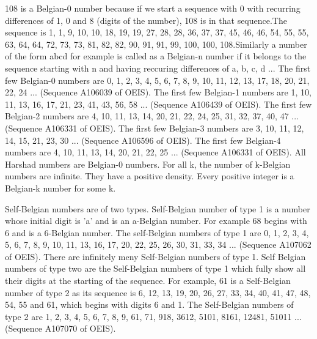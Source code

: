 \documentclass[12pt]{article}
\begin{document}
108 is a Belgian-0 number because if we start a sequence with 0 with recurring differences of 1, 0 and 8 (digits of the number), 108 is in that sequence.The sequence is 1, 1, 9, 10, 10, 18, 19, 19, 27, 28, 28, 36, 37, 37, 45, 46, 46, 54, 55, 55, 63, 64, 64, 72, 73, 73, 81, 82, 82, 90, 91, 91, 99, 100, 100, 108.Similarly a number of the form abcd for example is called as a Belgian-n number if it belongs to the sequence starting with n and having reccuring differences of a, b, c, d ...
The first few Belgian-0 numbers are 0, 1, 2, 3, 4, 5, 6, 7, 8, 9, 10, 11, 12, 13, 17, 18, 20, 21, 22, 24 ... (Sequence A106039 of OEIS). The first few Belgian-1 numbers are 1, 10, 11, 13, 16, 17, 21, 23, 41, 43, 56, 58 ... (Sequence A106439 of OEIS). The first few Belgian-2 numbers are 4, 10, 11, 13, 14, 20, 21, 22, 24, 25, 31, 32, 37, 40, 47 ... (Sequence A106331 of OEIS). The first few Belgian-3 numbers are 3, 10, 11, 12, 14, 15, 21, 23, 30 ... (Sequence A106596 of OEIS). The first few Belgian-4 numbers are 4, 10, 11, 13, 14, 20, 21, 22, 25 ... (Sequence A106331 of OEIS).
All Harshad numbers are Belgian-0 numbers. For all k, the number of k-Belgian numbers are infinite. They have a positive density. Every positive integer is a Belgian-k number for some k.

Self-Belgian numbers are of two types. Self-Belgian number of type 1 is a number whose initial digit is 'a' and is an a-Belgian number. For example 68 begins with 6 and is a 6-Belgian number. The self-Belgian numbers of type 1 are 0, 1, 2, 3, 4, 5, 6, 7, 8, 9, 10, 11, 13, 16, 17, 20, 22, 25, 26, 30, 31, 33, 34 ... (Sequence A107062 of OEIS). There are infinitely meny Self-Belgian numbers of type 1.
Self Belgian numbers of type two are the Self-Belgian numbers of type 1 which fully show all their digits at the starting of the sequence. For example, 61 is a Self-Belgian number of type 2 as its sequence is 6, 12, 13, 19, 20, 26, 27, 33, 34, 40, 41, 47, 48, 54, 55 and 61, which begins with digits 6 and 1. The Self-Belgian numbers of type 2 are 1, 2, 3, 4, 5, 6, 7, 8, 9, 61, 71, 918, 3612, 5101, 8161, 12481, 51011 ... (Sequence A107070 of OEIS).
\end{document}
